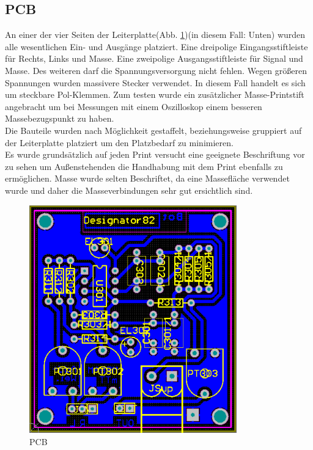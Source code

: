 \subsection{PCB}\label{subsec:5.1.4}
An einer der vier Seiten der Leiterplatte(Abb. \ref{fig:5.1.4.1})(in diesem Fall: Unten) wurden alle wesentlichen Ein- und Ausgänge platziert. Eine dreipolige Eingangsstiftleiste für Rechts, Links und Masse. Eine zweipolige Ausgangsstiftleiste für Signal und Masse. Des weiteren darf die Spannungsversorgung nicht fehlen. Wegen größeren Spannungen wurden massivere Stecker verwendet. In diesem Fall handelt es sich um steckbare Pol-Klemmen. Zum testen wurde ein zusätzlicher Masse-Printstift angebracht um bei Messungen mit einem Oszilloskop einem besseren Massebezugspunkt zu haben.\\
Die Bauteile wurden nach Möglichkeit gestaffelt, beziehungsweise gruppiert auf der Leiterplatte platziert um den Platzbedarf zu minimieren.\\
Es wurde grundsätzlich auf jeden Print versucht eine geeignete Beschriftung vor zu sehen um Außenstehenden die Handhabung mit dem Print ebenfalls zu ermöglichen. Masse wurde selten Beschriftet, da eine Massefläche verwendet wurde und daher die Masseverbindungen sehr gut ersichtlich sind.
\begin{figure} [H]
	\centering
	\includegraphics[width=0.8\textwidth]{img/Print3/3mTTWeicheruAddierer-PCB.PNG}
	\caption{PCB}
	\label {fig:5.1.4.1}
\end{figure}









